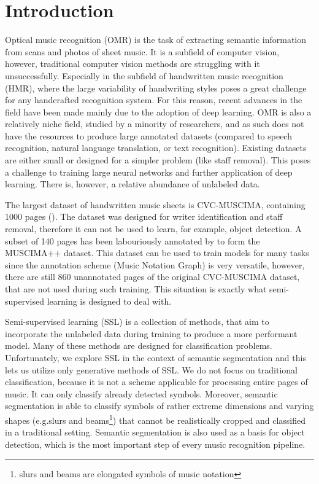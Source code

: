 \chapter{Introduction}
\label{chap:Introduction}

Optical music recognition (OMR) is the task of extracting semantic information from scans and photos of sheet music. It is a subfield of computer vision, however, traditional computer vision methods are struggling with it unsuccessfully. Especially in the subfield of handwritten music recognition (HMR), where the large variability of handwriting styles poses a great challenge for any handcrafted recognition system. For this reason, recent advances in the field have been made mainly due to the adoption of deep learning. OMR is also a relatively niche field, studied by a minority of researchers, and as such does not have the resources to produce large annotated datasets (compared to speech recognition, natural language translation, or text recognition). Existing datasets are either small or designed for a simpler problem (like staff removal). This poses a challenge to training large neural networks and further application of deep learning. There is, however, a relative abundance of unlabeled data.

The largest dataset of handwritten music sheets is CVC-MUSCIMA, containing 1000 pages (\cite{CvcMuscima}). The dataset was designed for writer identification and staff removal, therefore it can not be used to learn, for example, object detection. A subset of 140 pages has been labouriously annotated by \cite{MuscimaPP} to form the MUSCIMA++ dataset. This dataset can be used to train models for many tasks since the annotation scheme (Music Notation Graph) is very versatile, however, there are still 860 unannotated pages of the original CVC-MUSCIMA dataset, that are not used during such training. This situation is exactly what semi-supervised learning is designed to deal with.

Semi-supervised learning (SSL) is a collection of methods, that aim to incorporate the unlabeled data during training to produce a more performant model. Many of these methods are designed for classification problems. Unfortunately, we explore SSL in the context of semantic segmentation and this lets us utilize only generative methods of SSL. We do not focus on traditional classification, because it is not a scheme applicable for processing entire pages of music. It can only classify already detected symbols. Moreover, semantic segmentation is able to classify symbols of rather extreme dimensions and varying shapes (e.g.\@ slurs and beams\footnote{slurs and beams are elongated symbols of music notation}) that cannot be realistically cropped and classified in a traditional setting. Semantic segmentation is also used as a basis for object detection, which is the most important step of every music recognition pipeline.

